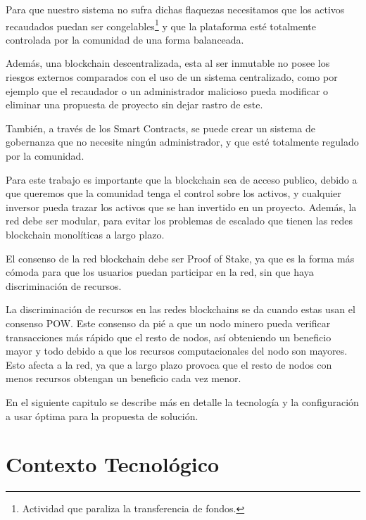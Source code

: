 \bigskip

Para que nuestro sistema no sufra dichas flaquezas necesitamos que los activos recaudados puedan ser congelables\footnote{Actividad que paraliza la transferencia de fondos.} y que la plataforma esté totalmente controlada por la comunidad de una forma balanceada.

\bigskip

Además, una blockchain descentralizada, esta al ser inmutable no posee los riesgos externos comparados con el uso de un sistema centralizado, como por ejemplo que el recaudador o un administrador malicioso pueda modificar o eliminar una propuesta de proyecto sin dejar rastro de este.

\bigskip

También, a través de los Smart Contracts, se puede crear un sistema de gobernanza que no necesite ningún administrador, y que esté totalmente regulado por la comunidad.

\bigskip

Para este trabajo es importante que la blockchain sea de acceso publico, debido a que queremos que la comunidad tenga el control sobre los activos, y cualquier inversor pueda trazar los activos que se han invertido en un proyecto. Además, la red debe ser modular, para evitar los problemas de escalado que tienen las redes blockchain monolíticas a largo plazo.

\bigskip

El consenso de la red blockchain debe ser Proof of Stake, ya que es la forma más cómoda para que los usuarios puedan participar en la red, sin que haya discriminación de recursos.

\bigskip

La discriminación de recursos en las redes blockchains se da cuando estas usan el consenso POW. Este consenso da pié a  que un nodo minero pueda verificar transacciones más rápido que el resto de nodos, así obteniendo un beneficio mayor y todo debido a que los recursos computacionales del nodo son mayores. Esto afecta a la red, ya que a largo plazo provoca que el resto de nodos con menos recursos obtengan un beneficio cada vez menor. 

\bigskip

En el siguiente capitulo se describe más en detalle la tecnología y la configuración a usar óptima para la propuesta de solución.

\newpage

\section{Contexto Tecnológico}

